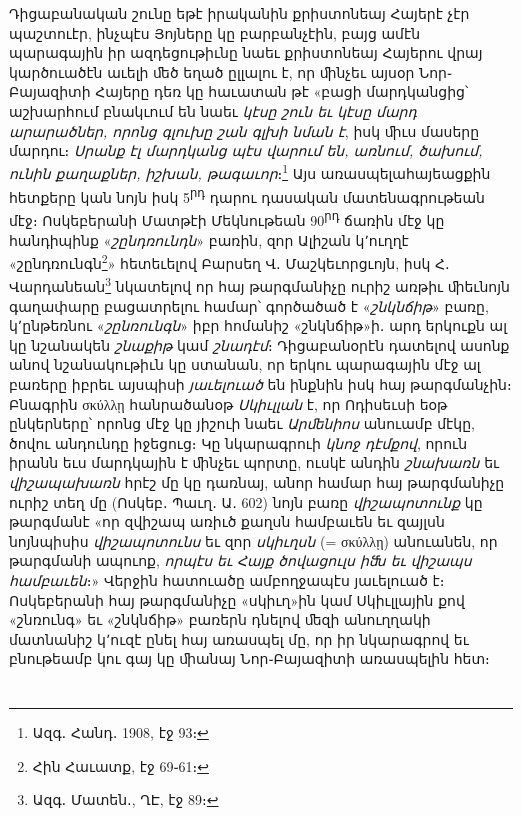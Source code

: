 \documentclass{article}
\begin{document}
{Դիցաբանական շունը եթէ իրականին քրիստոնեայ Հայերէ չէր պաշտուէր, ինչպէս Յոյները կը բարբանչէին, բայց ամէն պարագային իր ազդեցութիւնը նաեւ քրիստոնեայ Հայերու վրայ կարծուածէն աւելի ﬔծ եղած ըլլալու է, որ ﬕնչեւ այսօր Նոր֊Բայազիտի Հայերը դեռ կը հաւատան թէ «բացի մարդկանցից՝ աշխարհում բնակւում են նաեւ \emph{կէսը շուն եւ կէսը մարդ արարածներ, որոնց գլուխը շան գլխի նման է}, իսկ ﬕւս մասերը մարդու։ \emph{Սրանք էլ մարդկանց պէս վարում են, առնում, ծախում, ունին քաղաքներ, իշխան, թագաւոր}։\footnote{Ազգ․ Հանդ․ 1908, էջ 93։} Այս առասպելահայեացքին հետքերը կան նոյն իսկ 5\textsuperscript{րդ} դարու դասական մատենագրութեան մէջ։ Ոսկեբերանի Մատթէի Մեկնութեան 90\textsuperscript{րդ} ճառին մէջ կը հանդիպինք «\emph{շընդռունդն}» բառին, զոր Ալիշան կ՚ուղղէ «շընդռունգն\footnote{Հին Հաւատք, էջ 69֊61։}» հետեւելով Բարսեղ Վ․ Մաշկեւորցւոյն, իսկ Հ․ Վարդանեան\footnote{Ազգ․ Մատեն․, ՂԷ, էջ 89։} նկատելով որ հայ թարգմանիչը ուրիշ առթիւ ﬕեւնոյն գաղափարը բացատրելու համար՝ գործածած է «\emph{շնկնճիթ}» բառը, կ՚ընթեռնու «\emph{շընռունգն}» իբր հոմանիշ «շնկնճիթ»ի․ արդ երկուքն ալ կը նշանակեն \emph{շնաքիթ} կամ \emph{շնադէմ}։ Դիցաբանօրէն դատելով ասոնք անով նշանակութիւն կը ստանան, որ երկու պարագային մէջ ալ բառերը իբրեւ այսպիսի \emph{յաւելուած} են ինքնին իսկ հայ թարգմանչին։ Բնագրին σκύλλῃ հանրածանօթ \emph{Սկիւլլան} է, որ Ոդիսեւսի եօթ ընկերները՝ որոնց մէջ կը յիշուի նաեւ \emph{Արﬔնիոս} անուամբ մէկը, ծովու անդունդը իջեցուց։ Կը նկարագրուի \emph{կնոջ դէմքով}, որուն իրանն եւս մարդկային է ﬕնչեւ պորտը, ուսկէ անդին \emph{շնախառն} եւ \emph{վիշապախառն} հրէշ մը կը դառնայ, անոր համար հայ թարգմանիչը ուրիշ տեղ մը (Ոսկեբ․ Պաւղ․ Ա․ 602) նոյն բառը \emph{վիշապոտունք} կը թարգմանէ «որ զվիշապ առիւծ քաղսն համբաւեն եւ զայլսն նոյնպիսիս \emph{վիշապոտունս} եւ զոր \emph{սկիւղսն} (= σκύλλῃ) անուանեն, որ թարգմանի ապուոք, \emph{որպէս եւ Հայք ծովացուլս իﬓ եւ վիշապս համբաւեն}։» Վերջին հատուածը ամբողջապէս յաւելուած է։ Ոսկեբերանի հայ թարգմանիչը «սկիւղ»ին կամ Սկիւլլային քով «շնռունգ» եւ «շնկնճիթ» բառերն դնելով ﬔզի անուղղակի մատնանիշ կ՚ուզէ ընել հայ առասպել մը, որ իր նկարագրով եւ բնութեամբ կու գայ կը ﬕանայ Նոր֊Բայազիտի առասպելին հետ։}
\clearpage
\section{}
\subsection{}
\end{document}

